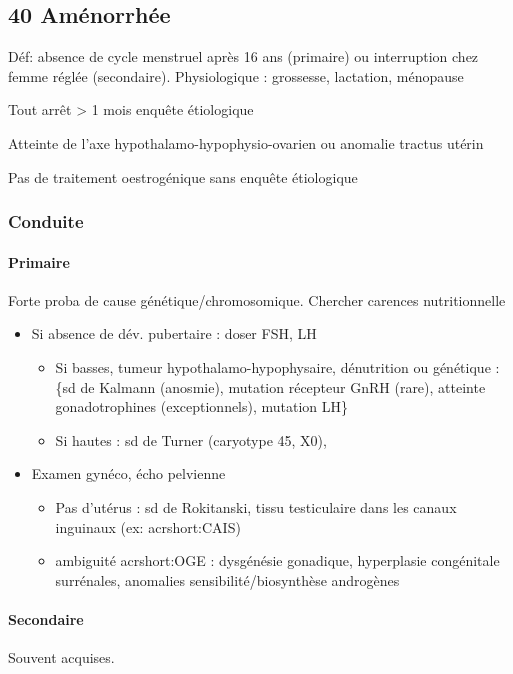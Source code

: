 \documentclass[11pt]{article}
\begin{document}
\subsection{40 \textdagger{} Aménorrhée}
\label{sec:orgb80f463}
Déf: absence de cycle menstruel après 16 ans (primaire) ou interruption chez
femme réglée (secondaire). Physiologique : grossesse, lactation, ménopause

Tout arrêt > 1 mois \thus enquête étiologique \danger

Atteinte de l'axe hypothalamo-hypophysio-ovarien ou anomalie tractus utérin

\begin{tcolorbox}
Pas de traitement oestrogénique sans enquête étiologique
\end{tcolorbox}

\subsubsection{Conduite}
\label{sec:orgd6bfe6f}
\paragraph{Primaire}
\label{sec:orgb12fa45}
Forte proba de cause génétique/chromosomique. Chercher carences nutritionnelle

\begin{itemize}
\item Si absence de dév. pubertaire : doser FSH, LH
\begin{itemize}
\item Si basses, tumeur hypothalamo-hypophysaire, dénutrition ou génétique : \{sd
de Kalmann (anosmie), mutation récepteur GnRH (rare), atteinte
gonadotrophines (exceptionnels), mutation LH\}
\item Si hautes : sd de Turner (caryotype 45, X0),
\end{itemize}
\item Examen gynéco, écho pelvienne
\begin{itemize}
\item Pas d'utérus : sd de Rokitanski, tissu testiculaire dans les canaux
inguinaux (ex: acrshort:CAIS)
\item ambiguité acrshort:OGE : dysgénésie gonadique, hyperplasie congénitale surrénales,
anomalies sensibilité/biosynthèse androgènes
\end{itemize}
\end{itemize}
\paragraph{Secondaire}
\label{sec:orgf031e08}
Souvent acquises. 
\end{document}
